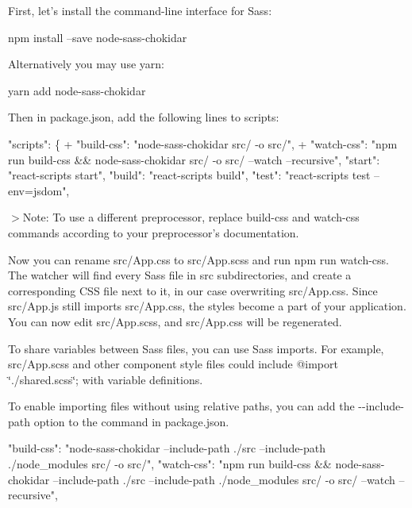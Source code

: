 First, let’s install the command-\/line interface for Sass\+:


\begin{DoxyCode}
npm install --save node-sass-chokidar
\end{DoxyCode}


Alternatively you may use {\ttfamily yarn}\+:


\begin{DoxyCode}
yarn add node-sass-chokidar
\end{DoxyCode}


Then in {\ttfamily package.\+json}, add the following lines to {\ttfamily scripts}\+:


\begin{DoxyCode}
   "scripts": \{
+    "build-css": "node-sass-chokidar src/ -o src/",
+    "watch-css": "npm run build-css && node-sass-chokidar src/ -o src/ --watch --recursive",
     "start": "react-scripts start",
     "build": "react-scripts build",
     "test": "react-scripts test --env=jsdom",
\end{DoxyCode}


$>$Note\+: To use a different preprocessor, replace {\ttfamily build-\/css} and {\ttfamily watch-\/css} commands according to your preprocessor’s documentation.

Now you can rename {\ttfamily src/\+App.\+css} to {\ttfamily src/\+App.\+scss} and run {\ttfamily npm run watch-\/css}. The watcher will find every Sass file in {\ttfamily src} subdirectories, and create a corresponding C\+SS file next to it, in our case overwriting {\ttfamily src/\+App.\+css}. Since {\ttfamily src/\+App.\+js} still imports {\ttfamily src/\+App.\+css}, the styles become a part of your application. You can now edit {\ttfamily src/\+App.\+scss}, and {\ttfamily src/\+App.\+css} will be regenerated.

To share variables between Sass files, you can use Sass imports. For example, {\ttfamily src/\+App.\+scss} and other component style files could include {\ttfamily @import \char`\"{}./shared.\+scss\char`\"{};} with variable definitions.

To enable importing files without using relative paths, you can add the {\ttfamily -\/-\/include-\/path} option to the command in {\ttfamily package.\+json}.


\begin{DoxyCode}
"build-css": "node-sass-chokidar --include-path ./src --include-path ./node\_modules src/ -o src/",
"watch-css": "npm run build-css && node-sass-chokidar --include-path ./src --include-path ./node\_modules
       src/ -o src/ --watch --recursive",
\end{DoxyCode}


